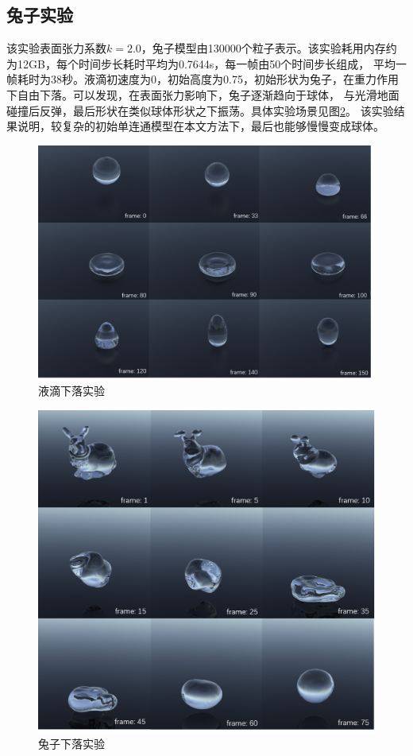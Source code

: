 \subsection{兔子实验}
该实验表面张力系数$k = 2.0$，兔子模型由130000个粒子表示。该实验耗用内存约为12GB，每个时间步长耗时平均为0.7644s，每一帧由50个时间步长组成，
平均一帧耗时为38秒。液滴初速度为0，初始高度为0.75，初始形状为兔子，在重力作用下自由下落。可以发现，在表面张力影响下，兔子逐渐趋向于球体，
与光滑地面碰撞后反弹，最后形状在类似球体形状之下振荡。具体实验场景见图\ref{fig: bunny drop experience}。
该实验结果说明，较复杂的初始单连通模型在本文方法下，最后也能够慢慢变成球体。

\begin{figure}[htbp]
    \centering
    \includegraphics[scale=0.56]{./images/DropNotSplashEXP.png}
    \caption[液滴下落实验]{液滴下落实验}
    \label{fig: sphere Drop experience}
\end{figure}

\begin{figure}[htbp]
    \centering
    \includegraphics[scale=0.56]{./images/bunnyDrop.png}
    \caption[兔子下落实验]{兔子下落实验}
    \label{fig: bunny drop experience}
\end{figure}


